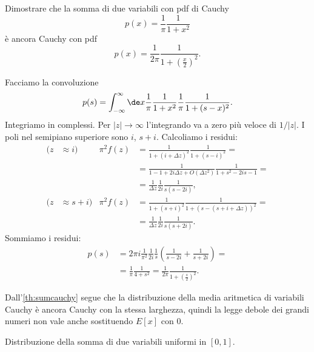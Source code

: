 \begin{exercise}
	\label{th:sumcauchy}
	Dimostrare che la somma di due variabili con pdf di Cauchy
	\begin{equation*}
		p(x) = \frac1\pi \frac1{1+x^2}
	\end{equation*}
	è ancora Cauchy con pdf
	\begin{equation*}
		p(x) = \frac1{2\pi} \frac1{1 + \left(\frac x2\right)^2}.
	\end{equation*}
\end{exercise}

\begin{solution}
	Facciamo la convoluzione
	\begin{equation*}
		p(s) = \int_{-\infty}^\infty \de x \frac1\pi \frac1{1+x^2} \frac1\pi \frac1{1+(s-x)^2}.
	\end{equation*}
	Integriamo in complessi.
	Per $|z|\to\infty$ l'integrando va a zero più veloce di $1/|z|$.
	I poli nel semipiano superiore sono $i$, $s+i$.
	Calcoliamo i residui:
	\begin{align*}
		(z &\approx i) & \pi^2f(z)
		&= \frac1{1+(i+\Delta z)^2} \frac1{1+(s-i)^2} = \\
		&&&= \frac1{1-1+2i\Delta z+O(\Delta z^2)} \frac1{1+s^2-2is-1} = \\
		&&&= \frac1{\Delta z} \frac1{2i} \frac1{s(s-2i)}, \\
		(z &\approx s+i) & \pi^2f(z)
		&= \frac1{1+(s+i)^2} \frac1{1+(s-(s+i+\Delta z))^2} = \\
		&&&= \frac1{\Delta z} \frac1{2i} \frac1{s(s+2i)}.
	\end{align*}
	Sommiamo i residui:
	\begin{align*}
		p(s) &= 2\pi i \frac1{\pi^2} \frac1{2i}\frac1s\left(\frac1{s-2i}+\frac1{s+2i}\right) = \\
		&= \frac1\pi \frac1{4+s^2} = \frac1{2\pi} \frac1{1+\left(\frac s2\right)^2}.
	\end{align*}
\end{solution}

Dall'\autoref{th:sumcauchy} segue che la distribuzione della media aritmetica di variabili Cauchy è ancora Cauchy con la stessa larghezza,
quindi la legge debole dei grandi numeri non vale anche sostituendo $E[x]$ con $0$.

\begin{exercise}
	Distribuzione della somma di due variabili uniformi in $[0,1]$.
\end{exercise}

